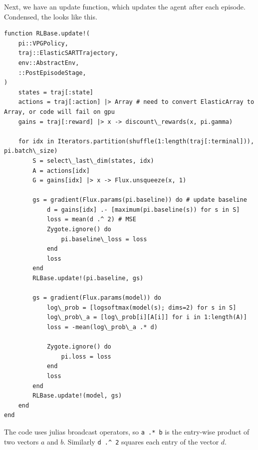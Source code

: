 \documentclass{article}
\theoremstyle{changedot}
\theoremstyle{changedotbreak}
\theoremstyle{nonumberplain}
\begin{document}
Next, we have an update function, which updates the agent after each episode. Condensed, the looks like this.

\begin{verbatim}
function RLBase.update!(
    pi::VPGPolicy,
    traj::ElasticSARTTrajectory,
    env::AbstractEnv,
    ::PostEpisodeStage,
)
    states = traj[:state]
    actions = traj[:action] |> Array # need to convert ElasticArray to Array, or code will fail on gpu
    gains = traj[:reward] |> x -> discount\_rewards(x, pi.gamma)

    for idx in Iterators.partition(shuffle(1:length(traj[:terminal])), pi.batch\_size)
        S = select\_last\_dim(states, idx)
        A = actions[idx]
        G = gains[idx] |> x -> Flux.unsqueeze(x, 1)

        gs = gradient(Flux.params(pi.baseline)) do # update baseline
            d = gains[idx] .- [maximum(pi.baseline(s)) for s in S]
            loss = mean(d .^ 2) # MSE
            Zygote.ignore() do
                pi.baseline\_loss = loss
            end
            loss
        end
        RLBase.update!(pi.baseline, gs)

        gs = gradient(Flux.params(model)) do
            log\_prob = [logsoftmax(model(s); dims=2) for s in S]
            log\_prob\_a = [log\_prob[i][A[i]] for i in 1:length(A)]
            loss = -mean(log\_prob\_a .* d)

            Zygote.ignore() do
                pi.loss = loss
            end
            loss
        end
        RLBase.update!(model, gs)
    end
end
\end{verbatim}

The code uses julias broadcast operators, so \verb|a .* b| is the entry-wise product of two vectors $a$ and $b$. Similarly \verb|d .^ 2| squares each entry of the vector $d$.
\end{document}
